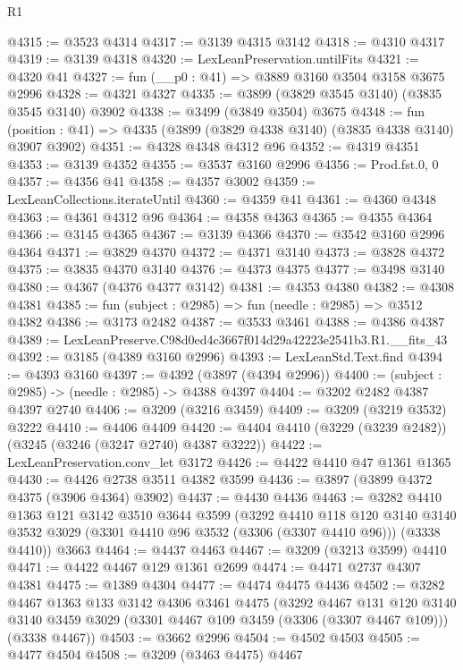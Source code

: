 \begin{lexlean}{R1}
\begin{coremodule}
@4315 := @3523 @4314
@4317 := @3139 @4315 @3142
@4318 := @4310 @4317
@4319 := @3139 @4318
@4320 := LexLeanPreservation.untilFits
@4321 := @4320 @41
@4327 := fun (__p0 : @41) => @3889 @3160 @3504 @3158 @3675 @2996
@4328 := @4321 @4327
@4335 := @3899 (@3829 @3545 @3140) (@3835 @3545 @3140) @3902
@4338 := @3499 (@3849 @3504) @3675
@4348 := fun (position : @41) => @4335 (@3899 (@3829 @4338 @3140) (@3835 @4338 @3140) @3907 @3902)
@4351 := @4328 @4348 @4312 @96
@4352 := @4319 @4351
@4353 := @3139 @4352
@4355 := @3537 @3160 @2996
@4356 := Prod.fst.{0, 0}
@4357 := @4356 @41
@4358 := @4357 @3002
@4359 := LexLeanCollections.iterateUntil
@4360 := @4359 @41
@4361 := @4360 @4348
@4363 := @4361 @4312 @96
@4364 := @4358 @4363
@4365 := @4355 @4364
@4366 := @3145 @4365
@4367 := @3139 @4366
@4370 := @3542 @3160 @2996 @4364
@4371 := @3829 @4370
@4372 := @4371 @3140
@4373 := @3828 @4372
@4375 := @3835 @4370 @3140
@4376 := @4373 @4375
@4377 := @3498 @3140
@4380 := @4367 (@4376 @4377 @3142)
@4381 := @4353 @4380
@4382 := @4308 @4381
@4385 := fun (subject : @2985) => fun (needle : @2985) => @3512 @4382
@4386 := @3173 @2482
@4387 := @3533 @3461
@4388 := @4386 @4387
@4389 := LexLeanPreserve.C98d0ed4c3667f014d29a42223e2541b3.R1.__fits_43
@4392 := @3185 (@4389 @3160 @2996)
@4393 := LexLeanStd.Text.find
@4394 := @4393 @3160
@4397 := @4392 (@3897 (@4394 @2996))
@4400 := (subject : @2985) -> (needle : @2985) -> @4388 @4397
@4404 := @3202 @2482 @4387 @4397 @2740
@4406 := @3209 (@3216 @3459)
@4409 := @3209 (@3219 @3532) @3222
@4410 := @4406 @4409
@4420 := @4404 @4410 (@3229 (@3239 @2482)) (@3245 (@3246 (@3247 @2740) @4387 @3222))
@4422 := LexLeanPreservation.conv_let @3172
@4426 := @4422 @4410 @47 @1361 @1365
@4430 := @4426 @2738 @3511 @4382 @3599
@4436 := @3897 (@3899 @4372 @4375 (@3906 @4364) @3902)
@4437 := @4430 @4436
@4463 := @3282
    @4410
    @1363
    @121
    @3142
    @3510
    @3644
    @3599
    (@3292
      @4410
      @118
      @120
      @3140
      @3140
      @3532
      @3029
      (@3301 @4410 @96 @3532 (@3306 (@3307 @4410 @96)))
      (@3338 @4410))
    @3663
@4464 := @4437 @4463
@4467 := @3209 (@3213 @3599) @4410
@4471 := @4422 @4467 @129 @1361 @2699
@4474 := @4471 @2737 @4307 @4381
@4475 := @1389 @4304
@4477 := @4474 @4475 @4436
@4502 := @3282
    @4467
    @1363
    @133
    @3142
    @4306
    @3461
    @4475
    (@3292
      @4467
      @131
      @120
      @3140
      @3140
      @3459
      @3029
      (@3301 @4467 @109 @3459 (@3306 (@3307 @4467 @109)))
      (@3338 @4467))
@4503 := @3662 @2996
@4504 := @4502 @4503
@4505 := @4477 @4504
@4508 := @3209 (@3463 @4475) @4467

\end{coremodule}
\end{lexlean}

